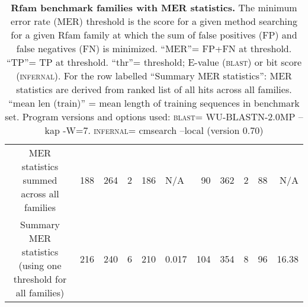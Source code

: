 \begin{table}
\begin{center}
\begin{tabular}{|ll|rrr|rrrrl|rrrrr|}
\multicolumn{5}{|c|}{MER statistics summed across all families} & 188
& 264 & 2 & 186 & N/A & 90 & 362 & 2 & 88 & N/A \\  
\multicolumn{5}{|c|}{Summary MER statistics (using one threshold for
all families)} & 216 & 240 & 6 & 210 &  0.017 & 104 & 354 & 8 & 96 &  16.38 \\ \hline 
\end{tabular}
\end{center}

\caption{\textbf{Rfam benchmark families with MER statistics.}
  The minimum error rate (MER) threshold is the score for a given
  method searching for a given Rfam family at which the sum of false
  positives (FP) and false negatives (FN) is
  minimized. ``MER''= FP+FN at threshold. ``TP''= TP at
  threshold. ``thr''= threshold; E-value (\textsc{blast}) or bit score
  (\textsc{infernal}). For the row labelled
  ``Summary MER statistics'': MER statistics are derived from ranked list
  of all hits across all families. ``mean len (train)'' = mean length
  of training sequences in benchmark set. 
  Program versions and options used: \textsc{blast}=
  WU-BLASTN-2.0MP --kap -W=7. \textsc{infernal}= cmsearch
  --local (version 0.70)}

\label{tbl:rmarkmer_fam}
\end{table}
